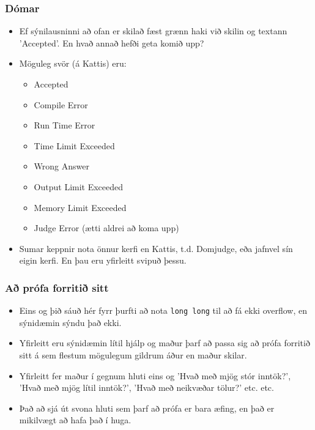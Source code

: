 \documentclass{beamer}
\begin{document}
\begin{frame}
\frametitle{Dómar}

\begin{itemize}

\item<1-> Ef sýnilausninni að ofan er skilað fæst grænn haki við skilin og textann 'Accepted'. En hvað annað hefði geta komið upp?

\item<2-> Möguleg svör (á Kattis) eru:

\begin{itemize}

\item<2-> Accepted

\item<2-> Compile Error

\item<2-> Run Time Error

\item<2-> Time Limit Exceeded

\item<2-> Wrong Answer

\item<2-> Output Limit Exceeded

\item<2-> Memory Limit Exceeded

\item<2-> Judge Error (ætti aldrei að koma upp)

\end{itemize}

\item<3-> Sumar keppnir nota önnur kerfi en Kattis, t.d. Domjudge, eða jafnvel sín eigin kerfi. En þau eru yfirleitt svipuð þessu.

\end{itemize}

\end{frame}

\begin{frame}
\frametitle{Að prófa forritið sitt}

\begin{itemize}

\item<1-> Eins og þið sáuð hér fyrr þurfti að nota \texttt{long long} til að fá ekki overflow, en sýnidæmin sýndu það ekki.

\item<2-> Yfirleitt eru sýnidæmin lítil hjálp og maður þarf að passa sig að prófa forritið sitt á sem flestum mögulegum gildrum áður en maður skilar.

\item<3-> Yfirleitt fer maður í gegnum hluti eins og 'Hvað með mjög stór inntök?', 'Hvað með mjög lítil inntök?', 'Hvað með neikvæðar tölur?' etc. etc.

\item<4-> Það að sjá út svona hluti sem þarf að prófa er bara æfing, en það er mikilvægt að hafa það í huga.

\end{itemize}

\end{frame}
\end{document}

